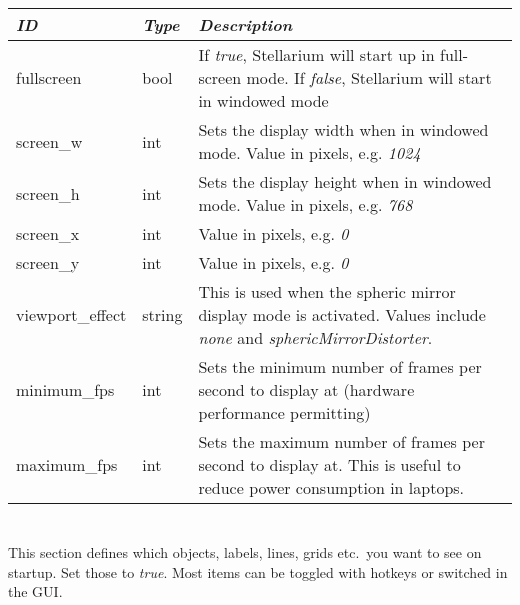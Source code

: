 \begin{longtabu} to \textwidth {l|l|X}
\toprule
\emph{ID} & \emph{Type} & \emph{Description}\\
\midrule
fullscreen & bool & If \emph{true}, Stellarium will start
up in full-screen mode. If \emph{false}, Stellarium will start in
windowed mode\\
\midrule
screen\_w & int & Sets the display width when in windowed mode. Value in pixels, e.g. \emph{1024}\\
\midrule
screen\_h & int & Sets the display height when in windowed mode. Value in pixels, e.g. \emph{768}\\
\midrule
screen\_x & int & Value in pixels, e.g. \emph{0}\\
\midrule
screen\_y & int & Value in pixels, e.g. \emph{0}\\
\midrule
viewport\_effect & string & This is used when the spheric mirror display mode is activated. Values include \emph{none} and \emph{sphericMirrorDistorter}.\\
\midrule
minimum\_fps & int & Sets the minimum number of frames per second to display at (hardware performance permitting)\\
\midrule
maximum\_fps & int & Sets the maximum number of frames per second to display at. This is useful to reduce power consumption in laptops.\\
\bottomrule
\end{longtabu}

\section{}\label{section-viewing}

This section defines which objects, labels, lines, grids etc.\ you want to see on startup. Set those to \emph{true}. Most items can be toggled with hotkeys or switched in the GUI.

